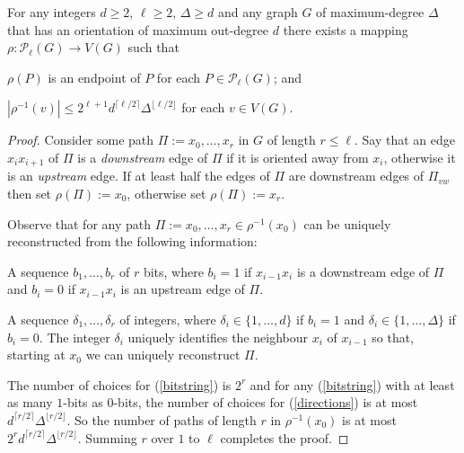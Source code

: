 \documentclass{patmorin}
\newcommand{\defin}[1]{\emph{\color{brightmaroon}#1}}
\begin{document}



\begin{lem}\label{advanced_cairns}
  For any integers $d\ge 2$, $\ell\ge 2$, $\Delta\ge d$ and any
  graph $G$ of maximum-degree $\Delta$ that has an orientation of maximum out-degree $d$ there exists a mapping $\rho:\mathcal{P}_\ell(G)\to V(G)$ such that
  \begin{compactenum}[(i)]
    \item $\rho(P)$ is an endpoint of $P$ for each $P\in\mathcal{P}_\ell(G)$; and
    \item $|\rho^{-1}(v)| \le 2^{\ell+1}d^{\lceil \ell/2\rceil}\Delta^{\lfloor\ell/2\rfloor}$ for each $v\in V(G)$.
  \end{compactenum}
\end{lem}

\begin{proof}
  Consider some path $\Pi:=x_0,\ldots,x_r$ in $G$ of length $r\le\ell$.  Say that an edge $x_ix_{i+1}$ of $\Pi$ is a \defin{downstream} edge of $\Pi$ if it is oriented away from $x_i$, otherwise it is an \defin{upstream} edge.  If at least half the edges of $\Pi$ are downstream edges of $\Pi_{vw}$ then set $\rho(\Pi):=x_0$, otherwise set $\rho(\Pi):=x_r$.

  Observe that for any path $\Pi:=x_0,\ldots,x_r\in \rho^{-1}(x_0)$ can be uniquely reconstructed from the following information:
  \begin{compactenum}[(a)]
    \item A sequence $b_1,\ldots,b_r$ of $r$ bits, where $b_i=1$ if $x_{i-1}x_i$ is a downstream edge of $\Pi$ and $b_i=0$ if $x_{i-1}x_i$ is an upstream edge of $\Pi$.\label{bitstring}
    \item A sequence $\delta_1,\ldots,\delta_r$ of integers, where $\delta_i\in\{1,\ldots,d\}$ if $b_i=1$ and $\delta_i\in\{1,\ldots,\Delta\}$ if $b_i=0$.  The integer $\delta_i$ uniquely identifies the neighbour $x_i$ of $x_{i-1}$ so that, starting at $x_0$ we can uniquely reconstruct $\Pi$.\label{directions}
  \end{compactenum}
  The number of choices for (\ref{bitstring}) is $2^r$ and for any (\ref{bitstring}) with at least as many $1$-bits as $0$-bits, the number of choices for (\ref{directions}) is at most $d^{\lceil r/2\rceil}\Delta^{\lfloor r/2\rfloor}$.  So the number of paths of length $r$ in $\rho^{-1}(x_0)$ is at most $2^rd^{\lceil r/2\rceil}\Delta^{\lfloor r/2\rfloor}$.  Summing $r$ over $1$ to $\ell$ completes the proof.
\end{proof}
\end{document}
